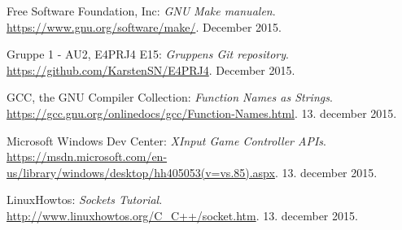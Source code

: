 \begin{thebibliography}{2}
 Free Software Foundation, Inc: \textit{GNU Make manualen}. \\
\url{https://www.gnu.org/software/make/}. December 2015.

 Gruppe 1 - AU2, E4PRJ4 E15: \textit{Gruppens Git repository}. \\
\url{https://github.com/KarstenSN/E4PRJ4}. December 2015.

 GCC, the GNU Compiler Collection: \textit{Function Names as Strings}. \\
\url{https://gcc.gnu.org/onlinedocs/gcc/Function-Names.html}. 13. december 2015.

 Microsoft Windows Dev Center: \textit{XInput Game Controller APIs}. \\
\url{https://msdn.microsoft.com/en-us/library/windows/desktop/hh405053(v=vs.85).aspx}. 13. december 2015.

 LinuxHowtos: \textit{Sockets Tutorial}. \\
\url{http://www.linuxhowtos.org/C_C++/socket.htm}. 13. december 2015.

\end{thebibliography}